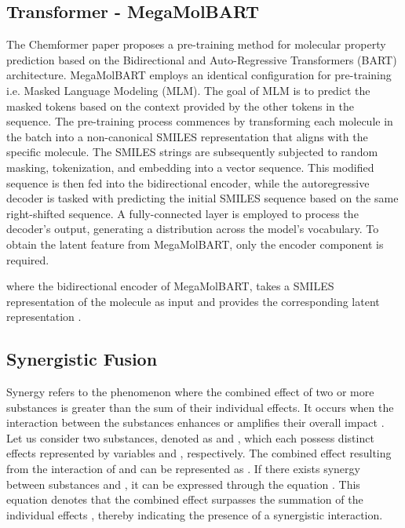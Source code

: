\documentclass[sigconf,nonacm]{acmart}
\begin{document}
\subsection{Transformer - MegaMolBART}

The Chemformer \cite{Irwin_2022} paper proposes a pre-training method for molecular property prediction based on the Bidirectional and Auto-Regressive Transformers (BART) \cite{lewis2020bart} architecture. 
MegaMolBART employs an identical configuration for pre-training i.e. Masked Language Modeling (MLM). The goal of MLM is to predict the masked tokens based on the context provided by the other tokens in the sequence. The pre-training process commences by transforming each molecule in the batch into a non-canonical SMILES representation that aligns with the specific molecule. The SMILES strings are subsequently subjected to random masking, tokenization, and embedding into a vector sequence. This modified sequence is then fed into the bidirectional encoder, while the autoregressive decoder is tasked with predicting the initial SMILES sequence based on the same right-shifted sequence. A fully-connected layer is employed to process the decoder's output, generating a distribution across the model's vocabulary. To obtain the latent feature from MegaMolBART, only the encoder component is required.

where the bidirectional encoder of MegaMolBART,  takes a SMILES representation of the molecule  as input and provides the corresponding latent representation .






\subsection{Synergistic Fusion}
Synergy refers to the phenomenon where the combined effect of two or more substances is greater than the sum of their individual effects. It occurs when the interaction between the substances enhances or amplifies their overall impact \cite{10.3389/fphar.2017.00158}. 
Let us consider two substances, denoted as  and , which each possess distinct effects represented by variables  and , respectively. The combined effect resulting from the interaction of  and  can be represented as . If there exists synergy between substances  and , it can be expressed through the equation . This equation denotes that the combined effect  surpasses the summation of the individual effects , thereby indicating the presence of a synergistic interaction.
\end{document}
